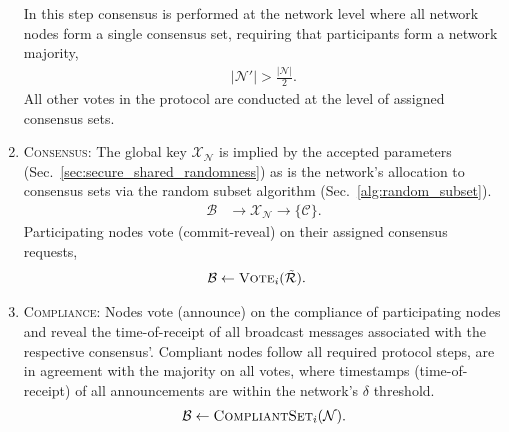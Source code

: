 \documentclass[twocolumn, aps, amsmath, amssymb, nofootinbib, superscriptaddress, longbibliography, floatfix, eqsecnum, rmp]{revtex4-2}
\begin{document}
\begin{enumerate}
		In this step consensus is performed at the network level where all network nodes form a single consensus set, requiring that participants form a network majority,
		\begin{align}
			|\mathcal{N}'|>\frac{|\mathcal{N}|}{2}.
		\end{align}
		All other votes in the protocol are conducted at the level of assigned consensus sets.
	\item \textsc{Consensus}: The global key $\mathcal{X}_{\mathcal{N}}$ is implied by the accepted parameters (Sec.~\ref{sec:secure_shared_randomness}) as is the network's allocation to consensus sets via the random subset algorithm (Sec.~\ref{alg:random_subset}). 
		\begin{align}
			\mathcal{B} &\to \mathcal{X}_{\mathcal{N}} \to \{\mathcal{C}\}.
		\end{align}
		Participating nodes vote (commit-reveal) on their assigned consensus requests,
		\begin{align}
			\mathcal{B} &\gets \textsc{Vote}_i(\tilde{\mathcal{R}}).
		\end{align}
	\item \textsc{Compliance}: Nodes vote (announce) on the compliance of participating nodes and reveal the time-of-receipt of all broadcast messages associated with the respective consensus'. Compliant nodes follow all required protocol steps, are in agreement with the majority on all votes, where timestamps (time-of-receipt) of all announcements are within the network's $\delta$ threshold.
		\begin{align}
			\mathcal{B} \gets \textsc{CompliantSet}_i(\mathcal{N}).
		\end{align}
	\end{enumerate}
 

\end{document}
